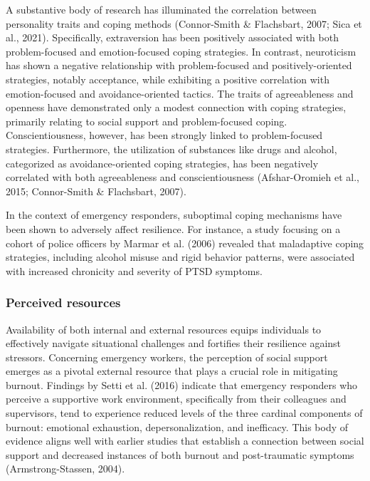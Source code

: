 \documentclass[
  man]{apa7}
\begin{document}
A substantive body of research has illuminated the correlation between personality traits and coping methods (Connor-Smith \& Flachsbart, 2007; Sica et al., 2021). Specifically, extraversion has been positively associated with both problem-focused and emotion-focused coping strategies. In contrast, neuroticism has shown a negative relationship with problem-focused and positively-oriented strategies, notably acceptance, while exhibiting a positive correlation with emotion-focused and avoidance-oriented tactics. The traits of agreeableness and openness have demonstrated only a modest connection with coping strategies, primarily relating to social support and problem-focused coping. Conscientiousness, however, has been strongly linked to problem-focused strategies. Furthermore, the utilization of substances like drugs and alcohol, categorized as avoidance-oriented coping strategies, has been negatively correlated with both agreeableness and conscientiousness (Afshar-Oromieh et al., 2015; Connor-Smith \& Flachsbart, 2007).

In the context of emergency responders, suboptimal coping mechanisms have been shown to adversely affect resilience. For instance, a study focusing on a cohort of police officers by Marmar et al. (2006) revealed that maladaptive coping strategies, including alcohol misuse and rigid behavior patterns, were associated with increased chronicity and severity of PTSD symptoms.

\hypertarget{perceived-resources}{%
\subsubsection{Perceived resources}\label{perceived-resources}}

Availability of both internal and external resources equips individuals to effectively navigate situational challenges and fortifies their resilience against stressors. Concerning emergency workers, the perception of social support emerges as a pivotal external resource that plays a crucial role in mitigating burnout. Findings by Setti et al. (2016) indicate that emergency responders who perceive a supportive work environment, specifically from their colleagues and supervisors, tend to experience reduced levels of the three cardinal components of burnout: emotional exhaustion, depersonalization, and inefficacy. This body of evidence aligns well with earlier studies that establish a connection between social support and decreased instances of both burnout and post-traumatic symptoms (Armstrong-Stassen, 2004).
\end{document}

